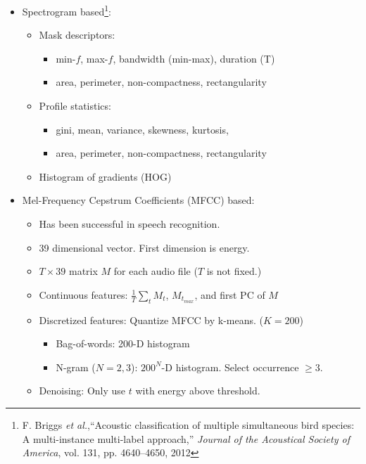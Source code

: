 \begin{itemize}
	\item Spectrogram based\footnote[1]{F. Briggs \emph{et al.},``Acoustic classification of multiple simultaneous bird species: A multi-instance multi-label approach,'' \emph{Journal of the Acoustical Society of America}, vol. 131, pp. 4640--4650, 2012}:
	\begin{itemize}
		\item Mask descriptors: 
		\begin{itemize}
			\item min-$f$, max-$f$, bandwidth (min-max), duration (T)
			\item area, perimeter, non-compactness, rectangularity		
		\end{itemize}
		\item Profile statistics:
		\begin{itemize}
			\item gini, mean, variance, skewness, kurtosis, 
			\item area, perimeter, non-compactness, rectangularity		
		\end{itemize}
		\item Histogram of gradients (HOG)
	\end{itemize}
	\item Mel-Frequency Cepstrum Coefficients (MFCC) based: 
	\begin{itemize}
		\item Has been successful in speech recognition.
		\item 39 dimensional vector. First dimension is energy.
		\item $ T \times 39$ matrix $M$ for each audio file ($T$ is not fixed.)
		\item Continuous features: $\frac{1}{T}\sum_t M_t$, $M_{t_{max}}$, and first PC of $M$
		\item Discretized features: Quantize MFCC by k-means. ($K=200$)
		\begin{itemize}
			\item Bag-of-words: 200-D histogram
			\item N-gram ($N=2,3$): $200^N$-D histogram. Select occurrence $\geq 3$. 
		\end{itemize}
		\item Denoising: Only use $t$ with energy above threshold.	
	\end{itemize}
\end{itemize}